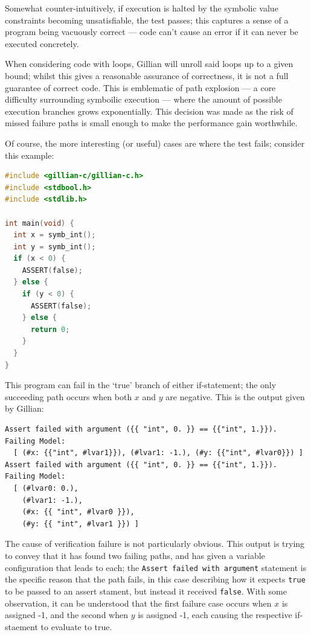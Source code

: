 Somewhat counter-intuitively, if execution is halted by the symbolic value
constraints becoming unsatisfiable, the test passes; this captures a sense of
a program being vacuously correct --- code can't cause an error if it can never
be executed concretely.

When considering code with loops, Gillian will unroll said loops up to a given
bound; whilst this gives a reasonable assurance of correctness, it is not a full
guarantee of correct code. This is emblematic of path explosion --- a core
difficulty surrounding symboilic execution --- where the amount of possible
execution branches grows exponentially. This decision was made as the risk of
missed failure paths is small enough to make the performance gain worthwhile.

Of course, the more interesting (or useful) cases are where the test fails;
consider this example:

\begin{lstlisting}[caption={Symbolic execution - assertion failure}, style=code, language=C]
#include <gillian-c/gillian-c.h>
#include <stdbool.h>
#include <stdlib.h>

int main(void) {
  int x = symb_int();
  int y = symb_int();
  if (x < 0) {
    ASSERT(false);
  } else {
    if (y < 0) {
      ASSERT(false);
    } else {
      return 0;
    }
  }
}
\end{lstlisting}

This program can fail in the `true' branch of either if-statement; the only
succeeding path occurs when both $x$ and $y$ are negative. This is the output
given by Gillian:

\begin{lstlisting}[numbers=none, style=terminal, caption={Symbolic execution - assertion failure (Gillian output)}]
Assert failed with argument ({{ "int", 0. }} == {{"int", 1.}}).
Failing Model:
  [ (#x: {{"int", #lvar1}}), (#lvar1: -1.), (#y: {{"int", #lvar0}}) ]
Assert failed with argument ({{ "int", 0. }} == {{"int", 1.}}).
Failing Model:
  [ (#lvar0: 0.),
    (#lvar1: -1.),
    (#x: {{ "int", #lvar0 }}),
    (#y: {{ "int", #lvar1 }}) ]
\end{lstlisting}

The cause of verification failure is not particularly obvious. This output is
trying to convey that it has found two failing paths, and has given a variable
configuration that leads to each; the \texttt{Assert failed with argument}
statement is the specific reason that the path fails, in this case describing
how it expects \texttt{true} to be passed to an assert stament, but instead it
received \texttt{false}. With some observation, it can be understood that the
first failure case occurs when $x$ is assigned -1, and the second when $y$ is
assigned -1, each causing the respective if-staement to evaluate to true.

